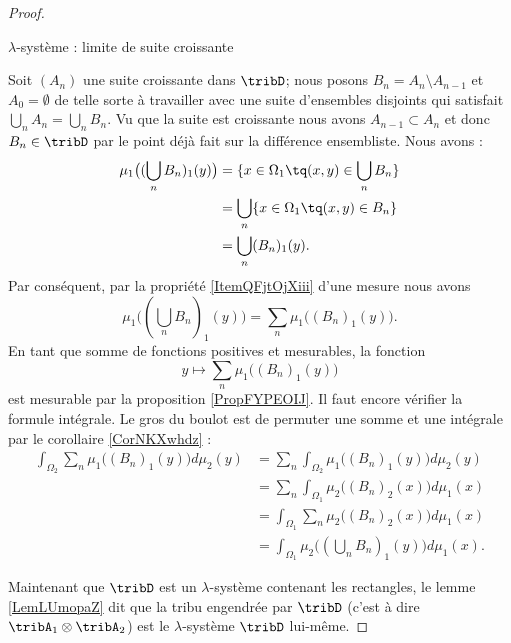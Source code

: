 \begin{proof}
\begin{subproof}
    
        \item[\( \lambda\)-système : limite de suite croissante]

            Soit \( (A_n)\) une suite croissante dans \( \tribD\); nous posons \( B_n=A_n\setminus A_{n-1}\) et \( A_0=\emptyset\) de telle sorte à travailler avec une suite d'ensembles disjoints qui satisfait \( \bigcup_nA_n=\bigcup_nB_n\). Vu que la suite est croissante nous avons \( A_{n-1}\subset A_n\) et donc \( B_n\in\tribD\) par le point déjà fait sur la différence ensembliste. Nous avons :
            \begin{subequations}
                \begin{align}
                    \mu_1\big( (\bigcup_nB_n)_1(y) \big)&=\{ x\in \Omega_1\tq (x,y)\in\bigcup_nB_n \}\\
                    &=\bigcup_n\{ x\in\Omega_1\tq (x,y)\in B_n \}\\
                    &=\bigcup_n (B_n)_1(y).
                \end{align}
            \end{subequations}
            Par conséquent, par la propriété \ref{ItemQFjtOjXiii} d'une mesure nous avons
            \begin{equation}
                \mu_1\big( (\bigcup_nB_n)_1(y) \big)=\sum_n\mu_1\big( (B_n)_1(y) \big).
            \end{equation}
            En tant que somme de fonctions positives et mesurables, la fonction
            \begin{equation}
                y\mapsto\sum_n\mu_1\big( (B_n)_1(y) \big)
            \end{equation}
            est mesurable par la proposition \ref{PropFYPEOIJ}. Il faut encore vérifier la formule intégrale. Le gros du boulot est de permuter une somme et une intégrale par le corollaire \ref{CorNKXwhdz} :
            \begin{subequations}
                \begin{align}
                    \int_{\Omega_2}\sum_n\mu_1\big( (B_n)_1(y) \big)d\mu_2(y)&=\sum_n\int_{\Omega_2}\mu_1\big( (B_n)_1(y) \big)d\mu_2(y)\\
                    &=\sum_n\int_{\Omega_1}\mu_2\big( (B_n)_2(x) \big)d\mu_1(x)\\
                    &=\int_{\Omega_1}\sum_n\mu_2\big( (B_n)_2(x) \big)d\mu_1(x)\\
                    &=\int_{\Omega_1}\mu_2\big( (\bigcup_nB_n)_1(y) \big)d\mu_1(x).
                \end{align}
            \end{subequations}
    \end{subproof}
    Maintenant que \( \tribD\) est un $\lambda$-système contenant les rectangles, le lemme \ref{LemLUmopaZ} dit que la tribu engendrée par \( \tribD\) (c'est à dire \( \tribA_1\otimes \tribA_2\)) est le $\lambda$-système \( \tribD\) lui-même.


\end{proof}

